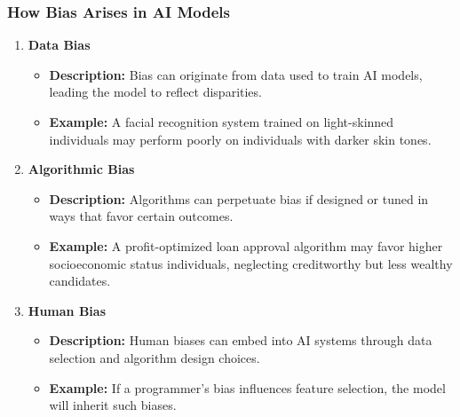 \documentclass[aspectratio=169]{beamer}
\begin{document}
\begin{frame}[fragile]
  \frametitle{How Bias Arises in AI Models}

  \begin{enumerate}
    \item \textbf{Data Bias}
      \begin{itemize}
        \item \textbf{Description:} Bias can originate from data used to train AI models, leading the model to reflect disparities.
        \item \textbf{Example:} A facial recognition system trained on light-skinned individuals may perform poorly on individuals with darker skin tones.
      \end{itemize}
      
    \item \textbf{Algorithmic Bias}
      \begin{itemize}
        \item \textbf{Description:} Algorithms can perpetuate bias if designed or tuned in ways that favor certain outcomes.
        \item \textbf{Example:} A profit-optimized loan approval algorithm may favor higher socioeconomic status individuals, neglecting creditworthy but less wealthy candidates.
      \end{itemize}

    \item \textbf{Human Bias}
      \begin{itemize}
        \item \textbf{Description:} Human biases can embed into AI systems through data selection and algorithm design choices.
        \item \textbf{Example:} If a programmer's bias influences feature selection, the model will inherit such biases.
      \end{itemize}
  \end{enumerate}
\end{frame}
\end{document}

